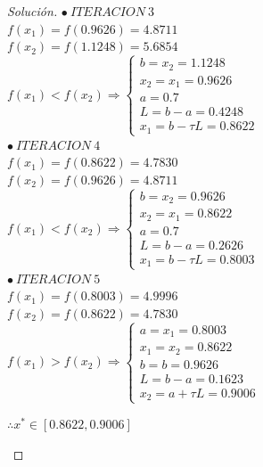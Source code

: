 \documentclass[12pt,oneside]{book}
\newenvironment{solution}{\begin{proof}[Solución]}{\end{proof}}
\begin{document}
\begin{solution}
	$\bullet\ ITERACION\ 3$\\

	$f(x_1)=f(0.9626)=4.8711$\\
	$f(x_2)=f(1.1248)=5.6854$\\
	
	$f(x_1)<f(x_2) \Rightarrow \left\{\begin{array}{l}
		b=x_2=1.1248\\
		x_2=x_1=0.9626 \\
		a=0.7 \\
		L=b-a=0.4248 \\
		x_1=b-\tau L=0.8622
	\end{array} \right.$\\[0.5cm]	
	
	$\bullet\ ITERACION\ 4$\\
	
	$f(x_1)=f(0.8622)=4.7830$\\
	$f(x_2)=f(0.9626)=4.8711$\\	
	
	$f(x_1)<f(x_2) \Rightarrow \left\{\begin{array}{l}
		b=x_2=0.9626\\
		x_2=x_1=0.8622 \\
		a=0.7 \\
		L=b-a=0.2626 \\
		x_1=b-\tau L=0.8003
	\end{array} \right.$\\[0.5cm]

	$\bullet\ ITERACION\ 5$\\
	
	$f(x_1)=f(0.8003)=4.9996$\\	
	$f(x_2)=f(0.8622)=4.7830$\\
	
	$f(x_1)>f(x_2) \Rightarrow \left\{\begin{array}{l}
		a=x_1=0.8003\\
		x_1=x_2=0.8622\\
		b=b=0.9626\\
		L=b-a=0.1623\\
		x_2=a+\tau L=0.9006
	\end{array} \right.$\\[0.5cm]

    \begin{center}
	    $\therefore x^* \in [0.8622,0.9006]$
    \end{center}
\end{solution}
\end{document}

